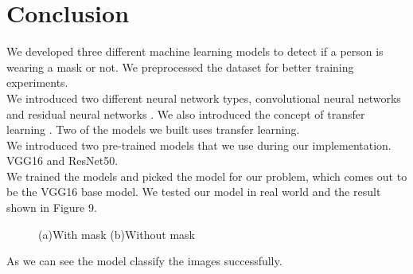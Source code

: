 \documentclass{article}
\begin{document}
\section{Conclusion}
We developed three different machine learning models to detect if a person is wearing a mask or not. We preprocessed the dataset for better training experiments.\\
We introduced two different neural network types, convolutional neural networks\cite{albawi2017understanding}
 and residual neural networks\cite{he2016deep}
. We also introduced the concept of transfer learning\cite{pan2009survey}
. Two of the models we built uses transfer learning. \\
We introduced two pre-trained models that we use during our implementation. VGG16\cite{simonyan2014very}
 and ResNet50\cite{he2016deep}.\\
We trained the models and picked the model for our problem, which comes out to be the VGG16 base model. We tested our model in real world and the result shown in Figure 9.
\begin{figure}[H]
    \centering

    \caption{(a)With mask (b)Without mask}
\end{figure}
As we can see the model classify the images successfully. 
\end{document}
